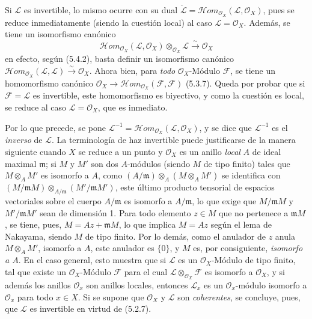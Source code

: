\begin{env}[5.4.3]
Si $\mathcal{L}$ es invertible, lo mismo ocurre con su dual
$\check{\mathcal{L}}=
\mathcal{H}\!om_{\mathcal{O}_X}(\mathcal{L},\mathcal{O}_X)$, pues se reduce
inmediatamente (siendo la cuestión local) al caso $\mathcal{L}=\mathcal{O}_X$. Además,
se tiene un isomorfismo canónico
\[
  \mathcal{H}\!om_{\mathcal{O}_X}(\mathcal{L},\mathcal{O}_X)
  \otimes_{\mathcal{O}_X}\mathcal{L}
  \xrightarrow{\sim}
  \mathcal{O}_X
  \tag{5.4.3.1}\label{0.5.4.3.1-fr}
\]
en efecto, según (5.4.2), basta definir un isomorfismo canónico
$\mathcal{H}\!om_{\mathcal{O}_X}(\mathcal{L},\mathcal{L})
\xrightarrow{\sim}\mathcal{O}_X$. Ahora bien, para \emph{todo}
$\mathcal{O}_X$-Módulo $\mathcal{F}$, se tiene un homomorfismo canónico
$\mathcal{O}_X\longrightarrow
\mathcal{H}\!om_{\mathcal{O}_X}(\mathcal{F},\mathcal{F})$ (5.3.7). Queda
por probar que si $\mathcal{F}=\mathcal{L}$ es invertible, este homomorfismo
es biyectivo, y como la cuestión es local, se reduce al caso
$\mathcal{L}=\mathcal{O}_X$, que es inmediato.

Por lo que precede, se pone
$\mathcal{L}^{-1}=
\mathcal{H}\!om_{\mathcal{O}_X}(\mathcal{L},\mathcal{O}_X)$, y se dice que
$\mathcal{L}^{-1}$ es el \emph{inverso} de $\mathcal{L}$. La terminología de
\og haz invertible\fg{} puede justificarse de la manera siguiente cuando $X$ se
reduce a un punto y $\mathcal{O}_X$ es un anillo \emph{local} $A$ de ideal
maximal $\mathfrak m$; si $M$ y $M'$ son dos $A$-módulos (siendo $M$ de
tipo finito) tales que $M\otimes_A M'$ es isomorfo a $A$, como
$(A/\mathfrak m)\otimes_A(M\otimes_A M')$ se identifica con
$(M/\mathfrak mM)\otimes_{A/\mathfrak m}(M'/\mathfrak mM')$, este último
producto tensorial de espacios vectoriales sobre el cuerpo $A/\mathfrak m$ es
isomorfo a $A/\mathfrak m$, lo que exige que $M/\mathfrak mM$ y
$M'/\mathfrak mM'$ sean de dimensión 1. Para todo elemento $z\in M$
que no pertenece a $\mathfrak mM$, se tiene, pues, $M=Az+\mathfrak mM$, lo que
implica $M=Az$ según el lema de Nakayama, siendo $M$ de tipo finito.
Por lo demás, como el anulador de $z$ anula $M\otimes_A M'$, isomorfo a
$A$, este anulador es $\{0\}$, y $M$ es, por consiguiente, \emph{isomorfo a $A$}.
En el caso general, esto muestra que si $\mathcal{L}$ es un
$\mathcal{O}_X$-Módulo de tipo finito, tal que existe un
$\mathcal{O}_X$-Módulo $\mathcal{F}$ para el cual
$\mathcal{L}\otimes_{\mathcal{O}_X}\mathcal{F}$ es isomorfo a
$\mathcal{O}_X$, y si además los anillos $\mathcal{O}_x$ son anillos
locales, entonces $\mathcal{L}_x$ es un $\mathcal{O}_x$-módulo isomorfo a
$\mathcal{O}_x$ para todo $x\in X$. Si se supone que $\mathcal{O}_X$ y $\mathcal{L}$ son
\emph{coherentes}, se concluye, pues, que $\mathcal{L}$ es invertible
en virtud de (5.2.7).
\end{env}

